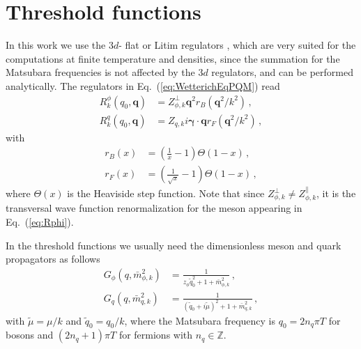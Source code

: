 \documentclass[%
reprint,
superscriptaddress,
showpacs,preprintnumbers,
 amsmath,amssymb,
 aps,
prd,
]{revtex4-1}
\def\Eq#1{Eq.~(\ref{#1})}
\begin{document}
\section{Threshold functions}
\label{app:thresholdfun}


In this work we use the $3d$- flat or Litim regulators \cite{Litim:2000ci,Litim:2001up}, which are very suited for the computations at finite temperature and densities, since the summation for the Matsubara frequencies is not affected by the $3d$ regulators, and can be performed analytically. The regulators in \Eq{eq:WetterichEqPQM} read
\begin{align}
  R^{\phi}_{k}(q_0,\bm{q})&=Z^{\perp}_{\phi,k}\bm{q}^2 r_B(\bm{q}^2/k^2)\,, \label{eq:Rphi}\\[2ex] 
  R^{q}_{k}(q_0,\bm{q})&=Z_{q,k}i\bm{\gamma} \cdot \bm{q} r_F(\bm{q}^2/k^2)\,, \label{eq:Rq}
\end{align} 
with 
\begin{align}
  r_B(x)&=\left( \frac{1}{x}-1 \right)\Theta(1-x)\,,\\[2ex] 
  r_F(x)&=\left( \frac{1}{\sqrt{x}}-1 \right)\Theta(1-x)\,,  \label{}
\end{align} 
where $\Theta(x)$ is the Heaviside step function. Note that since $Z^{\perp}_{\phi,k}\neq Z^{\parallel}_{\phi,k}$, it is  the transversal wave function renormalization for the meson appearing in \Eq{eq:Rphi}.

In the threshold functions we usually need the dimensionless meson and quark propagators as follows
\begin{align}
  G_\phi(q,\bar{m}^{2}_{\phi,k})&=\frac{1}{z_\phi\tilde{q}^{2}_{0}+1+\bar{m}^{2}_{\phi,k}}\,, \label{eq:Gphi}\\[2ex] 
  G_q(q,\bar{m}^{2}_{q,k})&=\frac{1}{(\tilde{q}_0+i\tilde{\mu})^2+1+\bar{m}^{2}_{q,k}}\,, \label{eq:Gq}
\end{align} 
with $\tilde{\mu}=\mu/k$ and $\tilde{q}_0=q_0/k$, where the Matsubara frequency is  $q_0=2n_q\pi  T$ for bosons and $(2n_q+1)\pi T $ for fermions with $n_q\in \mathbb{Z}$.
\end{document}

